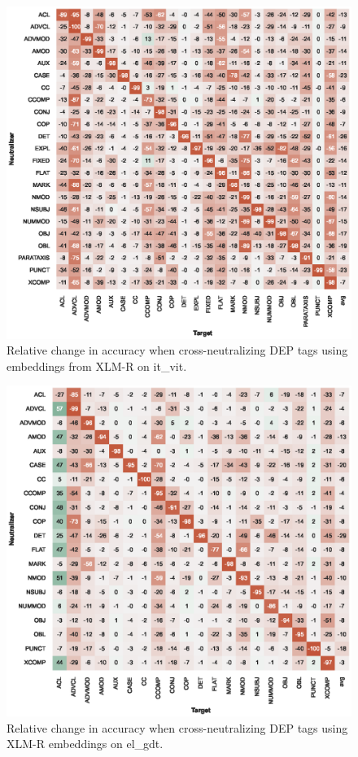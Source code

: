 \documentclass[11pt,a4paper]{article}
\begin{document}
\begin{figure}[t]
    \centering
    \includegraphics{full_figures/DEP_xlm-roberta-base_it_vit_acc_drop_agg=mean_probe=9_concat-mode=ONLY.eps}
    \caption{Relative change in accuracy when cross-neutralizing DEP tags using embeddings from XLM-R on it\_vit.}
    \label{fig:xneutr_xlm_dep_it_complete}
\end{figure}

\begin{figure}[t]
    \centering
    \includegraphics{full_figures/DEP_xlm-roberta-base_el_gdt_acc_drop_agg=mean_probe=9_concat-mode=ONLY.eps}
    \caption{Relative change in accuracy when cross-neutralizing DEP tags using XLM-R embeddings on el\_gdt.}
    \label{fig:xneutr_xlm_dep_gr_complete}
\end{figure}
\end{document}
